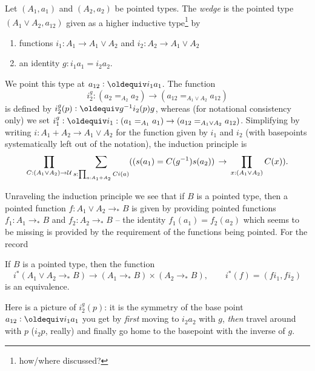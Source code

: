 {\begin{definition}
  \label{def:wedge}
  Let $(A_1,a_1)$ and $(A_2,a_2)$ be pointed types.  The \emph{wedge} is the pointed type $(A_1\vee A_2,a_{12})$ given as a higher inductive type\footnote{how/where discussed?} by
  \begin{enumerate}
  \item functions $i_1:A_1\to A_1\vee A_2$ and $i_2:A_2\to A_1\vee A_2$
  \item an identity $g:i_1a_1=i_2a_2$.
  \end{enumerate}
We point this type at $a_{12}\defequi i_1a_1$.
  The function 
$$i^g_2:(a_2=_{A_2}a_2)\to(a_{12}=_{A_1\vee A_2}a_{12})$$ 
is defined by $i^g_2(p)\defequi g^{-1}i_2(p)g$, whereas (for notational consistency only) we set $i_1^g\defequi i_1:(a_1=_{A_1}a_1)\to(a_{12}=_{A_1\vee A_2}a_{12})$.
Simplifying by writing $i:A_1+A_2\to A_1\vee A_2$ for the function given by $i_1$ and $i_2$ (with basepoints systematically left out of the notation), 
the induction principle is
$$\prod_{C:(A_1\vee A_2)\to\UU}\sum_{s:\prod_{a:A_1+A_2}Ci(a)}%
((s(a_1)=C(g^{-1})s(a_2))\,\to\,\prod_{x:(A_1\vee A_2)}C(x)).$$
\end{definition}


Unraveling the induction principle we see that if $B$ is a pointed type, then a  pointed function $f:A_1\vee A_2\to_* B$ is given by providing pointed functions $f_1:A_1\to_* B$ and $f_2:A_2\to_* B$  -- the identity $f_1(a_1)=f_2(a_2)$ which seems to be missing is provided by the requirement of the functions being pointed.  For the record
\begin{lemma}
  \label{lem:univvee}
  If $B$ is a pointed type, then the function 
  $$i^*(A_1\vee A_2\to_*B)\to(A_1\to_*B)\times(A_2\to_*B),\qquad i^*(f)=(fi_1,fi_2)
$$
is an equivalence.
\end{lemma}

Here is a picture of $i_2^g(p)$: it is the symmetry of the base point $a_{12}\defequi i_1a_1$ you get by \emph{first} moving to $i_2a_2$ with $g$, \emph{then} travel around with $p$ ($i_2p$, really) and finally go home to the basepoint with the inverse of $g$.

}
